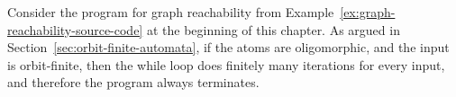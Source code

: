 




\begin{myexample}[Reachability]\label{ex:graph-reachability-source-code2}
	Consider the program for graph reachability  from Example~\ref{ex:graph-reachability-source-code} at the beginning of this chapter. As argued in Section~\ref{sec:orbit-finite-automata}, if the atoms are oligomorphic, and the input is orbit-finite, then the while loop  does finitely many iterations for every input, and therefore the program always terminates. 
\end{myexample}

